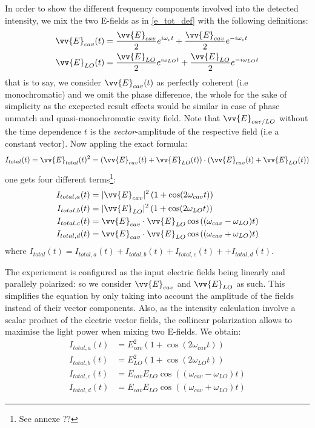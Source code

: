 \documentclass[10pt]{report}
\begin{document}
In order to show the different frequency components involved into the detected intensity, we mix the two E-fields as in \eqref{e_tot_def} with the following definitions:
\begin{align}
\label{e_cav_e_lo}
\begin{split}
\vv{E}_{cav}(t) &=\frac{\vv{E}_{cav}}{2} e^{i\omega_{c}t} + \frac{\vv{E}_{cav}}{2} e^{-i\omega_{c}t} \\
\vv{E}_{LO}(t) &= \frac{\vv{E}_{LO}}{2} e^{i\omega_{LO}t} + \frac{\vv{E}_{LO}}{2} e^{-i\omega_{LO}t}
\end{split}
\end{align}that is to say, we consider $\vv{E}_{cav}(t)$ as perfectly coherent (i.e monochromatic) and we omit the phase difference, the whole for the sake of simplicity as the excpected result effects would be similar in case of phase unmatch and quasi-monochromatic cavity field. Note that $\vv{E}_{cav/LO}$ without the time dependence $t$ is the \textit{vector}-amplitude of the respective field (i.e a constant vector). Now appling the exact formula:
\begin{equation}
I_{total}(t) = \vv{E}_{total}(t)^2 = \left(\vv{E}_{cav}(t) + \vv{E}_{LO}(t)\right) \cdot \left(\vv{E}_{cav}(t) + \vv{E}_{LO}(t)\right)
\end{equation} 
one gets four different terms\footnote{See annexe ??}:
\begin{align}
I_{total,a}(t) &= \vert\vv{E}_{cav}\vert^2\left(1 + \cos(2\omega_{cav}t)\right)\\
I_{total,b}(t) &= \vert\vv{E}_{LO}\vert^2\left(1 + \cos(2\omega_{LO}t)\right)\\
I_{total,c}(t) &= \vv{E}_{cav}\cdot\vv{E}_{LO}\cos\left((\omega_{cav} - \omega_{LO})t\right)\\
I_{total,d}(t) &= \vv{E}_{cav}\cdot\vv{E}_{LO}\cos\left((\omega_{cav} + \omega_{LO})t\right)
\end{align}
where $I_{total}(t) = I_{total,a}(t) + I_{total,b}(t) + I_{total,c}(t) + + I_{total,d}(t)$.

The experiement is configured as the input electric fields being linearly and parallely polarized: so we consider $\vv{E}_{cav}$ and $\vv{E}_{LO}$ as such. This simplifies the equation by only taking into account the amplitude of the fields instead of their vector components. Also, as the intensity calculation involve a scalar product of the electric vector fields, the collinear polarization allows to maximise the light power when mixing two E-fields. We obtain:
\begin{align}
I_{total,a}(t) &= E_{cav}^2\left(1 + \cos(2\omega_{cav}t)\right)\\
I_{total,b}(t) &= E_{LO}^2\left(1 + \cos(2\omega_{LO}t)\right)\\
\label{mix_hetero_ic}
I_{total,c}(t) &= E_{cav}E_{LO}\cos\left((\omega_{cav} - \omega_{LO})t\right)\\
\label{mix_hetero_id}
I_{total,d}(t) &= E_{cav}E_{LO}\cos\left((\omega_{cav} + \omega_{LO})t\right)
\end{align}
\end{document}

